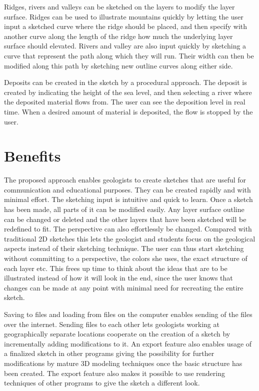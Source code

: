 \documentclass[a4paper,12pt]{report}
\begin{document}
Ridges, rivers and valleys can be sketched on the layers to modify the layer surface. Ridges can be used to illustrate mountains quickly by letting the user input a sketched curve where the ridge should be placed, and then specify with another curve along the length of the ridge how much the underlying layer surface should elevated. Rivers and valley are also input quickly by sketching a curve that represent the path along which they will run. Their width can then be modified along this path by sketching new outline curves along either side.	

Deposits can be created in the sketch by a procedural approach. The deposit is created by indicating the height of the sea level, and then selecting a river where the deposited material flows from. The user can see the deposition level in real time. When a desired amount of material is deposited, the flow is stopped by the user.

\section{Benefits}
The proposed approach enables geologists to create sketches that are useful for communication and educational purposes. They can be created rapidly and with minimal effort. The sketching input is intuitive and quick to learn. Once a sketch has been made, all parts of it can be modified easily. Any layer surface outline can be changed or deleted and the other layers that have been sketched will be redefined to fit. The perspective can also effortlessly be changed. Compared with traditional 2D sketches this lets the geologist and students focus on the geological aspects instead of their sketching technique. The user can thus start sketching without committing to a perspective, the colors she uses, the exact structure of each layer etc. This frees up time to think about the ideas that are to be illustrated instead of how it will look in the end, since the user knows that changes can be made at any point with minimal need for recreating the entire sketch.

Saving to files and loading from files on the computer enables sending of the files over the internet. Sending files to each other lets geologists working at geographically separate locations cooperate on the creation of a sketch by incrementally adding modifications to it. An export feature also enables usage of a finalized sketch in other programs giving the possibility for further modifications by mature 3D modeling techniques once the basic structure has been created. The export feature also makes it possible to use rendering techniques of other programs to give the sketch a different look.
\end{document}
